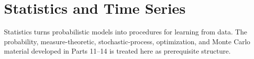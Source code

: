 \part{Statistics and Time Series}

Statistics turns probabilistic models into procedures for learning from data.  The probability, measure-theoretic, stochastic-process, optimization, and Monte Carlo material developed in Parts 11--14 is treated here as prerequisite structure.









